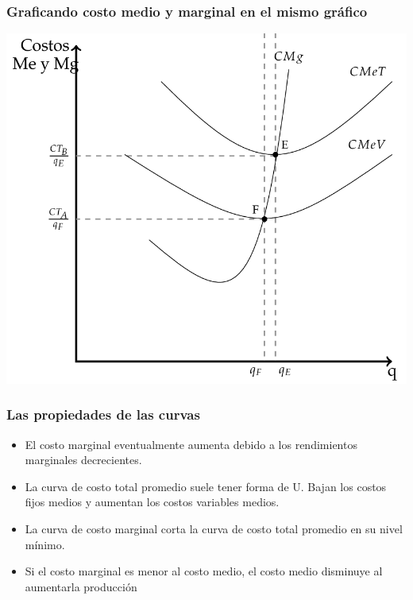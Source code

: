 \documentclass{beamer}
\begin{document}
\begin{frame}
\frametitle{Graficando costo medio y marginal en el mismo gráfico}
\centering
\includegraphics[scale=0.45]{../Figures/C13.8.png}
\end{frame}

\begin{frame}
\frametitle{Las propiedades de las curvas}
\begin{itemize}
    \item El costo marginal eventualmente aumenta debido a los rendimientos marginales decrecientes.
    \item La curva de costo total promedio suele tener forma de U. Bajan los costos fijos medios y aumentan los costos variables medios.
    \item La curva de costo marginal corta la curva de costo total promedio en su nivel mínimo.
    \item Si el costo marginal es menor al costo medio, el costo medio disminuye al aumentarla producción
\end{itemize}
\end{frame}
\end{document}
